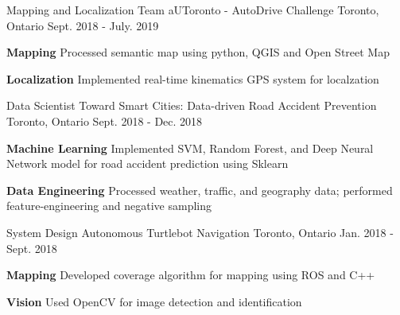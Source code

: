 \begin{cventries}
	\cventry
	{Mapping and Localization Team}
	{aUToronto - AutoDrive Challenge}
	{Toronto, Ontario}
	{Sept. 2018 - July. 2019}
	{
		\begin{cvitems}
			\item {\textbf{Mapping} Processed semantic map using python, QGIS and Open Street Map}
			\item {\textbf{Localization} Implemented real-time kinematics GPS system for localzation}
		\end{cvitems}
	}
	\cventry
	{Data Scientist}
	{Toward Smart Cities: Data-driven Road Accident Prevention}
	{Toronto, Ontario}
	{Sept. 2018 - Dec. 2018}
	{
		\begin{cvitems}
			\item {\textbf{Machine Learning} Implemented SVM, Random Forest, and Deep Neural Network model for road accident prediction using Sklearn}
			\item {\textbf{Data Engineering} Processed weather, traffic, and geography data; performed feature-engineering and negative sampling}
		\end{cvitems}
	}
	\cventry
	{System Design}
	{Autonomous Turtlebot Navigation}
	{Toronto, Ontario}
	{Jan. 2018 - Sept. 2018}
	{
		\begin{cvitems}
			\item {\textbf{Mapping} Developed coverage algorithm for mapping using ROS and C++}
			\item {\textbf{Vision} Used OpenCV for image detection and identification}
		\end{cvitems}
	}

\end{cventries}
